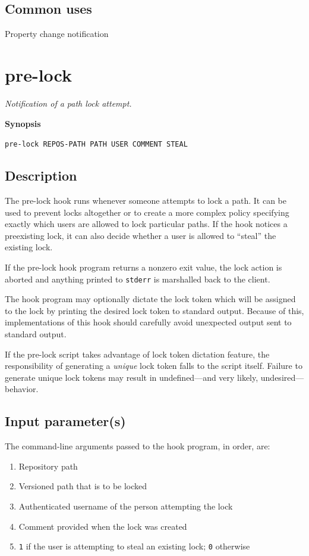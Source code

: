 \subsection{Common uses}

Property change notification

\section{pre-lock}\label{svn.ref.reposhooks.pre-lock}

\emph{Notification of a path lock attempt.}

\textbf{Synopsis}

\texttt{pre-lock\ REPOS-PATH\ PATH\ USER\ COMMENT\ STEAL}

\subsection{Description}

The pre-lock hook runs whenever someone attempts to lock a path. It can
be used to prevent locks altogether or to create a more complex policy
specifying exactly which users are allowed to lock particular paths. If
the hook notices a preexisting lock, it can also decide whether a user
is allowed to ``steal'' the existing lock.

If the pre-lock hook program returns a nonzero exit value, the lock
action is aborted and anything printed to \texttt{stderr} is marshalled
back to the client.

The hook program may optionally dictate the lock token which will be
assigned to the lock by printing the desired lock token to standard
output. Because of this, implementations of this hook should carefully
avoid unexpected output sent to standard output.

If the pre-lock script takes advantage of lock token dictation feature,
the responsibility of generating a \emph{unique} lock token falls to the
script itself. Failure to generate unique lock tokens may result in
undefined---and very likely, undesired---behavior.

\subsection{Input parameter(s)}

The command-line arguments passed to the hook program, in order, are:

\begin{enumerate}
\def\labelenumi{\arabic{enumi}.}
\item
  Repository path
\item
  Versioned path that is to be locked
\item
  Authenticated username of the person attempting the lock
\item
  Comment provided when the lock was created
\item
  \texttt{1} if the user is attempting to steal an existing lock;
  \texttt{0} otherwise
\end{enumerate}


